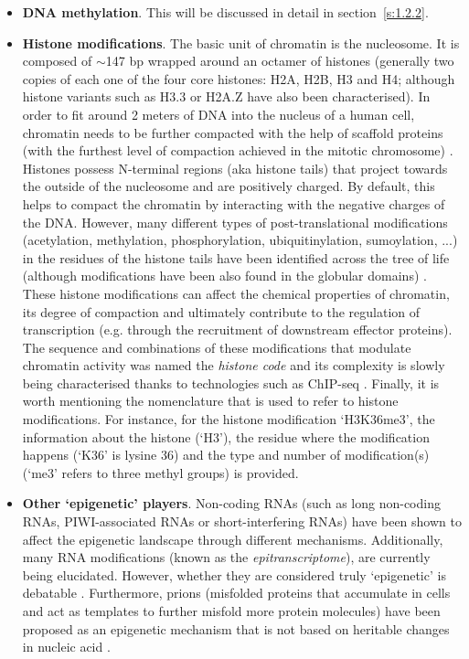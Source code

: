 \begin{itemize}
	
	\item \textbf{DNA methylation}. This will be discussed in detail in section~\ref{s:1.2.2}.
	
	\item \textbf{Histone modifications}. The basic unit of chromatin is the nucleosome. It is composed of $\sim$147 \acrshort{bp} wrapped around an octamer of histones (generally two copies of each one of the four core histones: H2A, H2B, H3 and H4; although histone variants such as H3.3 or H2A.Z have also been characterised). In order to fit around 2 meters of DNA into the nucleus of a human cell, chromatin needs to be further compacted with the help of scaffold proteins (with the furthest level of compaction achieved in the mitotic chromosome) \cite{Ou2017}. Histones possess N-terminal regions (aka histone tails) that project towards the outside of the nucleosome and are positively charged. By default, this helps to compact the chromatin by interacting with the negative charges of the DNA. However, many different types of post-translational modifications (acetylation, methylation, phosphorylation, ubiquitinylation, sumoylation, ...) in the residues of the histone tails have been identified across the tree of life (although modifications have been also found in the globular domains) \cite{Lawrence2016}. These histone modifications can affect the chemical properties of chromatin, its degree of compaction and ultimately contribute to the regulation of transcription (e.g. through the recruitment of downstream effector proteins). The sequence and combinations of these modifications that modulate chromatin activity was named the \textit{histone code} \cite{Strahl2000} and its complexity is slowly being characterised thanks to technologies such as \acrshort{ChIP-seq} \cite{Consortium2012, Consortium2015}. Finally, it is worth mentioning the nomenclature that is used to refer to histone modifications. For instance, for the histone modification `H3K36me3', the information about the histone (`H3'), the residue where the modification happens (`K36' is lysine 36) and the type and number of modification(s) (`me3' refers to three methyl groups) is provided.

	\item \textbf{Other `epigenetic' players}. Non-coding RNAs (such as long non-coding RNAs, PIWI-associated RNAs or short-interfering RNAs) have been shown to affect the epigenetic landscape through different mechanisms. Additionally, many RNA modifications (known as the \textit{epitranscriptome}), are currently being elucidated. However, whether they are considered truly `epigenetic' is debatable \cite{Mattick2009,Morris2014}. Furthermore, prions (misfolded proteins that accumulate in cells and act as templates to further misfold more protein molecules) have been proposed as an epigenetic mechanism that is not based on heritable changes in nucleic acid \cite{Halfmann2010}.
	
	
\end{itemize}

